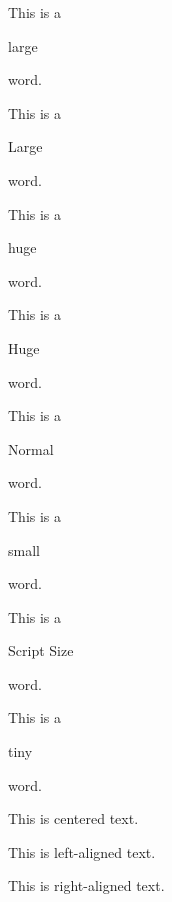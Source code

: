 \documentclass[10pt, letterpaper]{article}
\begin{document}
This is a \begin{large}large\end{large} word.

This is a \begin{Large}Large\end{Large} word.

This is a \begin{huge}huge\end{huge} word.

This is a \begin{Huge}Huge\end{Huge} word.

This is a \begin{normalsize}Normal\end{normalsize} word.

This is a \begin{small}small\end{small} word.

This is a \begin{scriptsize}Script Size\end{scriptsize} word.

This is a \begin{tiny}tiny\end{tiny} word.

\vspace{1cm}

\begin{center}
    This is centered text.
\end{center}

\begin{flushleft}
    This is left-aligned text.
\end{flushleft}

\begin{flushright}
    This is right-aligned text.
\end{flushright}








\vspace{1cm}
\end{document}
